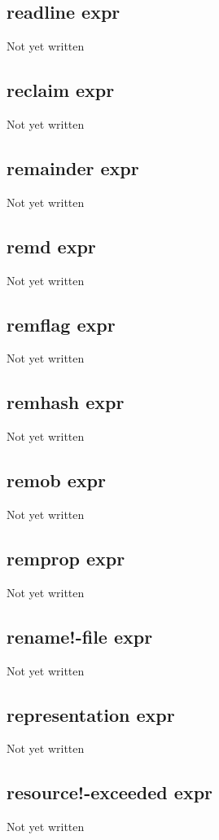 \documentclass[a4paper,11pt]{article}
\begin{document}
{\subsection{\ttfamily readline expr}
Not yet written

\subsection{\ttfamily reclaim expr}
Not yet written

\subsection{\ttfamily remainder expr}
Not yet written

\subsection{\ttfamily remd expr}
Not yet written

\subsection{\ttfamily remflag expr}
Not yet written

\subsection{\ttfamily remhash expr}
Not yet written

\subsection{\ttfamily remob expr}
Not yet written

\subsection{\ttfamily remprop expr}
Not yet written

\subsection{\ttfamily rename!-file expr}
Not yet written

\subsection{\ttfamily representation expr}
Not yet written

\subsection{\ttfamily resource!-exceeded expr}
Not yet written

}
\end{document}

